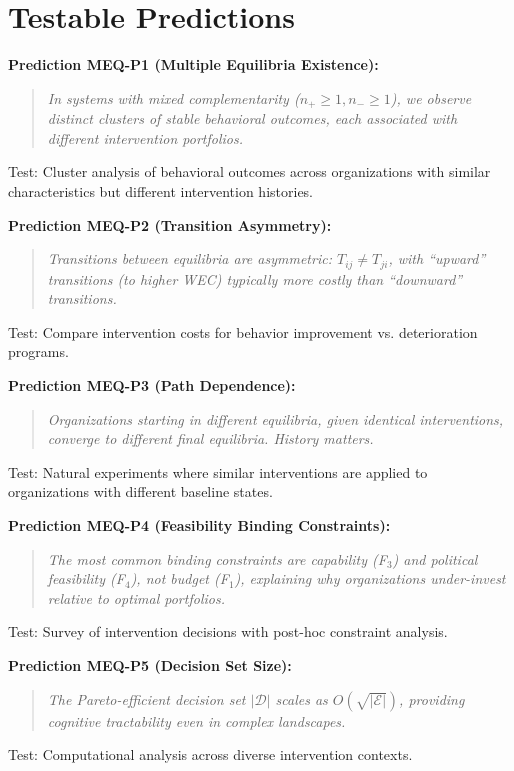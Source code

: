 \section{Testable Predictions}
\label{sec:meq-predictions}

\begin{tcolorbox}[colback=yellow!5!white, colframe=yellow!75!black,
    title=Falsifiable Predictions from MEQ]

\textbf{Prediction MEQ-P1 (Multiple Equilibria Existence):}
\begin{quote}
\textit{In systems with mixed complementarity ($n_+ \geq 1, n_- \geq 1$), we observe
distinct clusters of stable behavioral outcomes, each associated with different
intervention portfolios.}
\end{quote}
Test: Cluster analysis of behavioral outcomes across organizations with similar
characteristics but different intervention histories.

\textbf{Prediction MEQ-P2 (Transition Asymmetry):}
\begin{quote}
\textit{Transitions between equilibria are asymmetric: $T_{ij} \neq T_{ji}$, with
``upward'' transitions (to higher WEC) typically more costly than ``downward''
transitions.}
\end{quote}
Test: Compare intervention costs for behavior improvement vs. deterioration programs.

\textbf{Prediction MEQ-P3 (Path Dependence):}
\begin{quote}
\textit{Organizations starting in different equilibria, given identical interventions,
converge to different final equilibria. History matters.}
\end{quote}
Test: Natural experiments where similar interventions are applied to organizations
with different baseline states.

\textbf{Prediction MEQ-P4 (Feasibility Binding Constraints):}
\begin{quote}
\textit{The most common binding constraints are capability (F$_3$) and political
feasibility (F$_4$), not budget (F$_1$), explaining why organizations under-invest
relative to optimal portfolios.}
\end{quote}
Test: Survey of intervention decisions with post-hoc constraint analysis.

\textbf{Prediction MEQ-P5 (Decision Set Size):}
\begin{quote}
\textit{The Pareto-efficient decision set $|\mathcal{D}|$ scales as $O(\sqrt{|\mathcal{E}|})$,
providing cognitive tractability even in complex landscapes.}
\end{quote}
Test: Computational analysis across diverse intervention contexts.

\end{tcolorbox}

